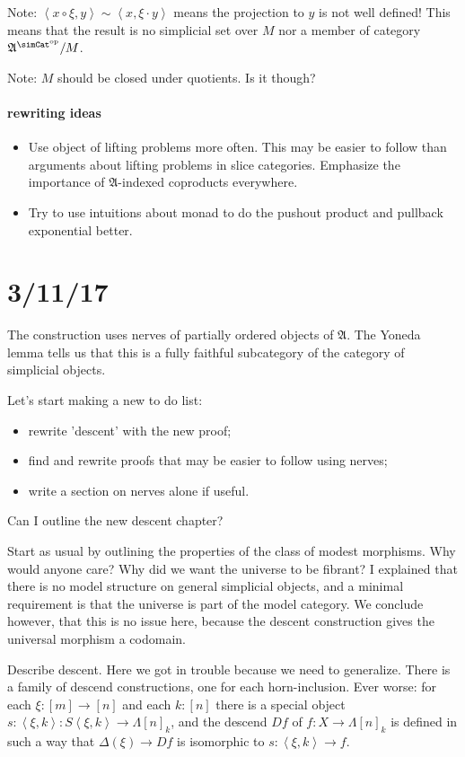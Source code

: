 \documentclass{tac}
\newcommand\dual{^{\mathrm{op}}}
\newcommand\s{^{\simCat\dual}}
\newcommand\of{:}
\newcommand\simplex\Delta
\newcommand\horn\Lambda
\newcommand\tuplet[1]{\left\langle #1 \right\rangle}
\newcommand\ambient{\mathfrak A}
\begin{document}
Note: $\tuplet{x\circ \xi , y}\sim\tuplet{x,\xi\cdot y}$ means the projection to $y$ is not well defined! This means that the result is no simplicial set over $M$ nor a member of category $\ambient\s/M$.

Note: $M$ should be closed under quotients. Is it though?


\paragraph{rewriting ideas}
\begin{itemize}
\item Use object of lifting problems more often. This may be easier to follow than arguments about lifting problems in slice categories. Emphasize the importance of $\ambient$-indexed coproducts everywhere.
\item Try to use intuitions about monad to do the pushout product and pullback exponential better.
\end{itemize}



\section{3/11/17}
The construction uses nerves of partially ordered objects of $\ambient$. The Yoneda lemma tells us that this is a fully faithful subcategory of the category of simplicial objects.

Let's start making a new to do list:
\begin{itemize}
\item rewrite 'descent' with the new proof;
\item find and rewrite proofs that may be easier to follow using nerves;
\item write a section on nerves alone if useful.
\end{itemize}

Can I outline the new descent chapter?

Start as usual by outlining the properties of the class of modest morphisms. Why would anyone care? Why did we want the universe to be fibrant?
I explained that there is no model structure on general simplicial objects, and a minimal requirement is that the universe is part of the model category.
We conclude however, that this is no issue here, because the descent construction gives the universal morphism a codomain.

Describe descent. Here we got in trouble because we need to generalize. There is a family of descend constructions, one for each horn-inclusion. Ever worse: for each $\xi\of[m]\to[n]$ and each $k\of [n]$ there is a special object $s\of\tuplet{\xi,k} \of S\tuplet{\xi,k} \to \horn[n]_k$, and the descend $Df$ of $f\of X\to \horn[n]_k$ is defined in such a way that $\simplex(\xi) \to Df$ is isomorphic to $s\of\tuplet{\xi,k} \to f$.
\end{document}
